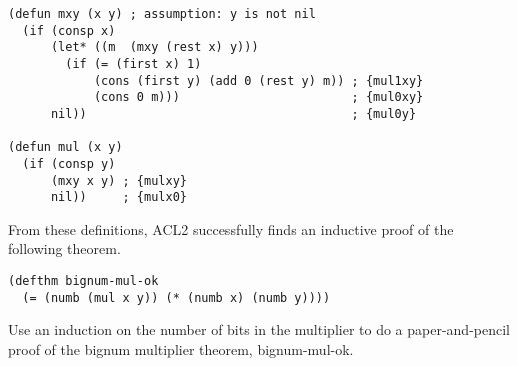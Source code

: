 \label{bignum-mul-defun}
\begin{Verbatim}
(defun mxy (x y) ; assumption: y is not nil
  (if (consp x)
      (let* ((m  (mxy (rest x) y)))
        (if (= (first x) 1)
            (cons (first y) (add 0 (rest y) m)) ; {mul1xy}
            (cons 0 m)))                        ; {mul0xy}
      nil))                                     ; {mul0y}

(defun mul (x y)
  (if (consp y)
      (mxy x y) ; {mulxy}
      nil))     ; {mulx0}
\end{Verbatim}

From these definitions, ACL2 successfully finds an
inductive proof of the following theorem.
\label{bignum-mul-thm}
\begin{Verbatim}
(defthm bignum-mul-ok
  (= (numb (mul x y)) (* (numb x) (numb y))))
\end{Verbatim}

\begin{ExerciseList}
\Exercise
Use an induction on the number of bits in the
multiplier to do a paper-and-pencil proof of 
the bignum multiplier theorem, bignum-mul-ok.
\end{ExerciseList}


